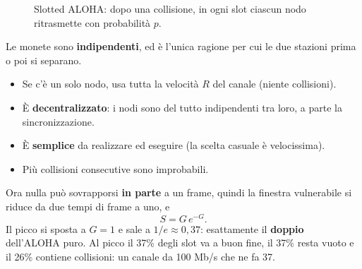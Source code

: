 \begin{figure}[H]
\centering
{}
\caption{Slotted ALOHA: dopo una collisione, in ogni slot ciascun nodo ritrasmette con probabilità $p$.}
\end{figure}

Le monete sono \textbf{indipendenti}, ed è l'unica ragione per cui le due stazioni prima o poi si separano.

\begin{itemize}
    \item[\itick] Se c'è un solo nodo, usa tutta la velocità $R$ del canale (niente collisioni).
    \item[\itick] È \textbf{decentralizzato}: i nodi sono del tutto indipendenti tra loro, a parte la sincronizzazione.
    \item[\itick] È \textbf{semplice} da realizzare ed eseguire (la scelta casuale è velocissima).
    \item[\itick] Più collisioni consecutive sono improbabili.
\end{itemize}

Ora nulla può sovrapporsi \textbf{in parte} a un frame, quindi la finestra vulnerabile si riduce da due tempi di frame a uno, e
$$S = G\,e^{-G}.$$
Il picco si sposta a $G = 1$ e sale a $1/e \approx 0{,}37$: esattamente il \textbf{doppio} dell'ALOHA puro. Al picco il 37\% degli
slot va a buon fine, il 37\% resta vuoto e il 26\% contiene collisioni: un canale da 100 Mb/s che ne fa 37.

